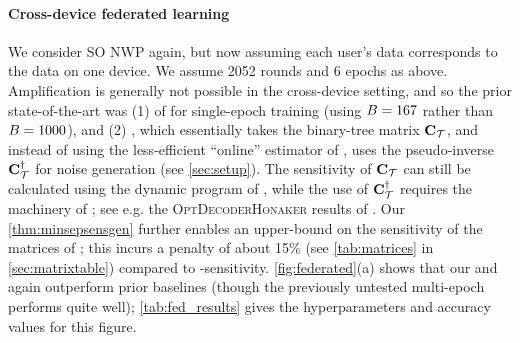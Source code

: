 \documentclass{article}
\begin{document}

\paragraph{Cross-device federated learning}
We consider SO NWP again, but now assuming each user's data corresponds to the data on one device. We assume 2052 rounds and 6 epochs as above. Amplification is generally not possible in the cross-device setting, and so the prior state-of-the-art was (1) \semf of \citet{denisov22matfact} for single-epoch training (using $B=167$ rather than $B=1000$), and (2) \opttreeagg, which essentially takes the binary-tree matrix $\mathbf{C}_{\mathcal{T}}$, and instead of using the less-efficient ``online'' estimator of \citet{honaker2015efficient}, uses the pseudo-inverse $\mathbf{C}_{\mathcal{T}}^\dagger$ for noise generation (see \cref{sec:setup}). The \bparticipation sensitivity of $\mathbf{C}_{\mathcal{T}}$ can still be calculated using the dynamic program of \citet{kairouz2021practical}, while the use of $\mathbf{C}_{\mathcal{T}}^\dagger$ requires the machinery of \citet{denisov22matfact}; see e.g. the \textsc{OptDecoderHonaker} results of \citet[Fig. 6]{choquette2022multi}. Our \cref{thm:minsepsensgen} further enables an upper-bound on the \bparticipation sensitivity of the \memf matrices of \citet{choquette2022multi}; this incurs a penalty of about 15\% (see \cref{tab:matrices} in \cref{sec:matrixtable}) compared to \multiepoch-sensitivity.  \cref{fig:federated}(a) shows that our \BANDMF and \memf again outperform prior baselines (though the previously untested multi-epoch \opttreeagg performs quite well); \cref{tab:fed_results} gives the hyperparameters and accuracy values for this figure.
%
\end{document}
